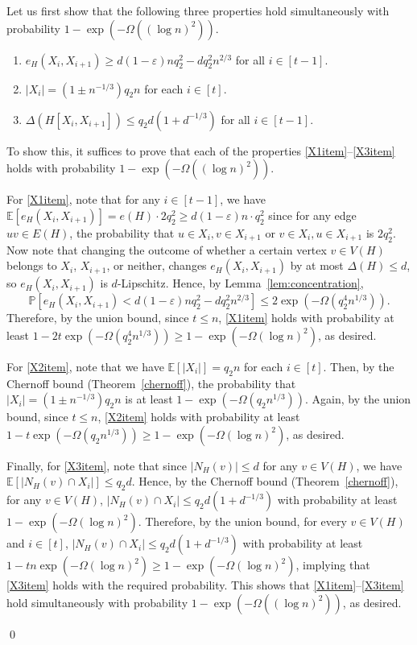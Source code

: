 \documentclass[10pt]{article}
\theoremstyle{plain}
\numberwithin{theorem}{section}
\theoremstyle{definition}
\theoremstyle{remark}
\renewenvironment{proof}[1][]{\begin{trivlist}
\item[\hspace{\labelsep}{\bf\noindent Proof#1.\/}] }{\qed\end{trivlist}}
\renewcommand{\Pr}{\mathbb{P}}
\newcommand{\eps}{\varepsilon}
\theoremstyle{plain}
\begin{document}
	\begin{proof}[ of claim]
		Let us first show that the following three properties hold simultaneously with probability $1 - \exp\left(-\Omega\left((\log n)^{2}\right)\right)$.
		\begin{enumerate}[label = \rm(X\arabic*)]
			\item \label{X1item}
				$e_H(X_i, X_{i+1}) \ge d(1 - \eps)n q_2^2 - d q_2^2 n^{2/3}$ for all $i \in [t-1]$. 
			\item \label{X2item}
				$|X_i| = (1 \pm n^{-1/3})q_2 n $ for each $i \in [t]$.
			\item \label{X3item}
				$\Delta(H[X_i, X_{i+1}]) \le q_2 d(1+d^{-1/3})$ for all $i \in [t-1]$.
		\end{enumerate}
		To show this, it suffices to prove that each of the properties \ref{X1item}--\ref{X3item} holds with probability $1 - \exp\left(-\Omega\left((\log n)^{2}\right)\right)$.

		For \ref{X1item}, note that for any $i \in [t-1]$, we have $\mathbb{E}[e_H(X_i, X_{i+1})] = e(H) \cdot 2q_2^2 \ge d(1 - \eps)n \cdot q_2^2$ since for any edge $uv \in E(H)$, the probability that $u \in X_i, v \in X_{i+1}$ or $v \in X_i, u \in X_{i+1}$ is $2q_2^2$. Now note that changing the outcome of whether a certain vertex $v \in V(H)$ belongs to $X_i$, $X_{i+1}$, or neither, changes $e_H(X_i, X_{i+1})$ by at most $\Delta(H) \le d$, so $e_H(X_i, X_{i+1})$ is $d$-Lipschitz. Hence, by Lemma~\ref{lem:concentration}, $$\Pr\left[e_H(X_i, X_{i+1}) < d(1 - \eps)n q_2^2 - d q_2^2 n^{2/3}\right] \le 2 \exp \left(-\Omega(q_2^4n^{1/3})\right).$$
		Therefore, by the union bound, since $t \le n$, \ref{X1item} holds with probability at least $1 - 2t \exp \left(-\Omega(q_2^4n^{1/3})\right) \ge 1 - \exp \left(-\Omega(\log n)^2\right)$, as desired. 

		For \ref{X2item}, note that we have $\mathbb{E}[|X_i|]= q_2 n$ for each $i \in [t]$. Then, by the Chernoff bound (Theorem~\ref{chernoff}), the probability that $|X_i| =  (1 \pm n^{-1/3})q_2 n$ is at least $1 - \exp \left(-\Omega(q_2 n^{1/3})\right)$. Again, by the union bound, since $t \le n$, \ref{X2item} holds with probability at least $1 - t \exp \left(-\Omega(q_2 n^{1/3})\right) \ge 1 - \exp \left(-\Omega(\log n)^2\right)$, as desired. 

		Finally, for \ref{X3item}, note that since $|N_H(v)| \le d$ for any $v \in V(H)$, we have $\mathbb{E}[|N_H(v) \cap X_i|] \le q_2 d$. Hence, by the Chernoff bound (Theorem~\ref{chernoff}), for any $v \in V(H)$, $|N_H(v) \cap X_i| \le q_2 d(1+d^{-1/3})$ with probability at least $ 1 - \exp \left(-\Omega(\log n)^2\right)$. Therefore, by the union bound, for every $v \in V(H)$ and $i \in [t]$, $|N_H(v) \cap X_i| \le q_2 d(1+d^{-1/3})$ with probability at least $1 - t n \exp \left(-\Omega(\log n)^2\right) \ge 1 - \exp \left(-\Omega(\log n)^2\right)$, implying that \ref{X3item} holds with the required probability. This shows that \ref{X1item}--\ref{X3item} hold simultaneously with probability $1 - \exp\left(-\Omega\left((\log n)^{2}\right)\right)$, as desired.


\end{proof}
\end{document}
